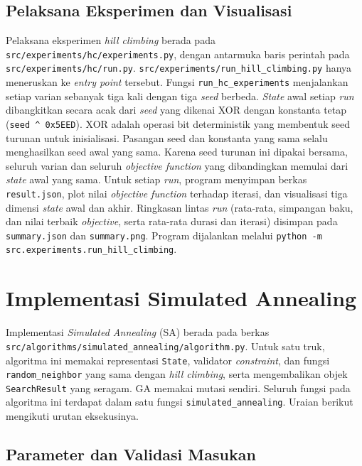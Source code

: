 \subsection{Pelaksana Eksperimen dan Visualisasi}
Pelaksana eksperimen \textit{hill climbing} berada pada \texttt{src/\allowbreak experiments/\allowbreak hc/\allowbreak experiments.py}, dengan antarmuka baris perintah pada \texttt{src/\allowbreak experiments/\allowbreak hc/\allowbreak run.py}.  \texttt{src/\allowbreak experiments/\allowbreak run\_\allowbreak hill\_\allowbreak climbing.py} hanya meneruskan ke \textit{entry point} tersebut. Fungsi \texttt{run\_hc\_experiments} menjalankan setiap varian sebanyak tiga kali dengan tiga \textit{seed} berbeda. \textit{State} awal setiap \textit{run} dibangkitkan secara acak dari \textit{seed} yang dikenai XOR dengan konstanta tetap (\texttt{seed \^{} 0x5EED}). XOR adalah operasi bit deterministik yang membentuk seed turunan untuk inisialisasi. Pasangan seed dan konstanta yang sama selalu menghasilkan seed awal yang sama. Karena seed turunan ini dipakai bersama, seluruh varian dan seluruh \textit{objective function} yang dibandingkan memulai dari \textit{state} awal yang sama. Untuk setiap \textit{run}, program menyimpan berkas \texttt{result.json}, plot nilai \textit{objective function} terhadap iterasi, dan visualisasi tiga dimensi \textit{state} awal dan akhir. Ringkasan lintas \textit{run} (rata-rata, simpangan baku, dan nilai terbaik \textit{objective}, serta rata-rata durasi dan iterasi) disimpan pada \texttt{summary.json} dan \texttt{summary.png}. Program dijalankan melalui \texttt{python -m src.experiments.run\_hill\_climbing}.

\section{Implementasi Simulated Annealing}

Implementasi \textit{Simulated Annealing} (SA) berada pada berkas \texttt{src/\allowbreak algorithms/\allowbreak simulated\_\allowbreak annealing/\allowbreak algorithm.py}. Untuk satu truk, algoritma ini memakai representasi \texttt{State}, validator \textit{constraint}, dan fungsi \texttt{random\_neighbor} yang sama dengan \textit{hill climbing}, serta mengembalikan objek \texttt{SearchResult} yang seragam. GA memakai mutasi sendiri. Seluruh fungsi pada algoritma ini terdapat dalam satu fungsi \texttt{simulated\_annealing}. Uraian berikut mengikuti urutan eksekusinya.

\subsection{Parameter dan Validasi Masukan}

